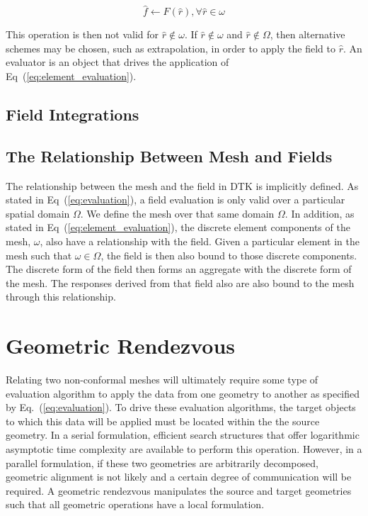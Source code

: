 \documentclass[letterpaper,12pt]{article}
\begin{document}
\begin{equation}
  \hat{f} \leftarrow F(\hat{r}), \forall \hat{r} \in \omega
  \label{eq:element_evaluation}
\end{equation}

This operation is then not valid for $\hat{r} \notin \omega$. If
$\hat{r} \notin \omega$ and $\hat{r} \notin \Omega$, then alternative
schemes may be chosen, such as extrapolation, in order to apply the
field to $\hat{r}$. An evaluator is an object that drives the
application of Eq~(\ref{eq:element_evaluation}).

\subsection{Field Integrations}

\subsection{The Relationship Between Mesh and Fields}
\label{subsec:mesh_and_fields}
The relationship between the mesh and the field in DTK is implicitly
defined. As stated in Eq~(\ref{eq:evaluation}), a field evaluation is
only valid over a particular spatial domain $\Omega$. We define the
mesh over that same domain $\Omega$. In addition, as stated in
Eq~(\ref{eq:element_evaluation}), the discrete element components of
the mesh, $\omega$, also have a relationship with the field. Given a
particular element in the mesh such that $\omega \in \Omega$, the
field is then also bound to those discrete components. The discrete
form of the field then forms an aggregate with the discrete form of
the mesh. The responses derived from that field also are also bound to
the mesh through this relationship.

\clearpage

\section{Geometric Rendezvous}\label{sec:rendezvous}
Relating two non-conformal meshes will ultimately require some type of
evaluation algorithm to apply the data from one geometry to another as
specified by Eq.~(\ref{eq:evaluation}). To drive these evaluation
algorithms, the target objects to which this data will be applied must
be located within the the source geometry. In a serial formulation,
efficient search structures that offer logarithmic asymptotic time
complexity are available to perform this operation. However, in a
parallel formulation, if these two geometries are arbitrarily
decomposed, geometric alignment is not likely and a certain degree of
communication will be required. A geometric rendezvous manipulates the
source and target geometries such that all geometric operations have a
local formulation.
\end{document}

